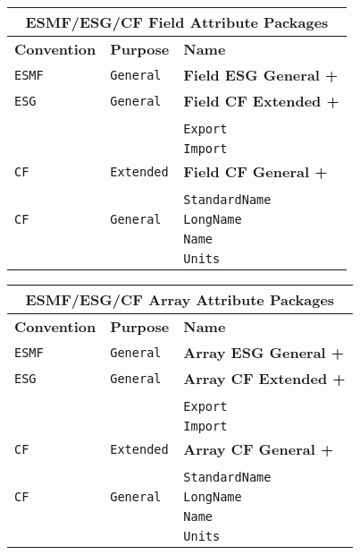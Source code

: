 \vspace{5pt}
\label{FieldAttributePackages}
\begin{tabular}{|p{4cm}|p{4cm}|p{6cm}|}
\hline
\multicolumn{3}{|c|}{{\bf \large ESMF/ESG/CF Field Attribute Packages}} \\
\hline\hline
{\bf Convention} & {\bf Purpose} & {\bf Name} \\
\hline\hline
{\tt ESMF} & {\tt General} & {\bf Field ESG General +} \\
{\tt ESG} & {\tt General} & {\bf Field CF Extended +} \\
& & \\
& & {\tt Export}  \\
 & & {\tt Import} \\ 
\hline
{\tt CF} & {\tt Extended} & {\bf Field CF General +} \\
& & \\
& & {\tt StandardName}\\ 
\hline
{\tt CF} & {\tt General} & {\tt LongName}\\
     & & {\tt Name} \\
     & & {\tt Units}  \\
\hline
\end{tabular}

\vspace{5pt}
\label{ArrayAttributePackages}
\begin{tabular}{|p{4cm}|p{4cm}|p{6cm}|}
\hline
\multicolumn{3}{|c|}{{\bf \large ESMF/ESG/CF Array Attribute Packages}} \\
\hline\hline
{\bf Convention} & {\bf Purpose} & {\bf Name} \\
\hline\hline
{\tt ESMF} & {\tt General} & {\bf Array ESG General +} \\
{\tt ESG} & {\tt General} & {\bf Array CF Extended +} \\
& & \\
& & {\tt Export}  \\
 & & {\tt Import} \\ 
\hline
{\tt CF} & {\tt Extended} & {\bf Array CF General +} \\
& & \\
& & {\tt StandardName}\\ 
\hline
{\tt CF} & {\tt General} & {\tt LongName}\\
     & & {\tt Name} \\
     & & {\tt Units}  \\
\hline
\end{tabular}

